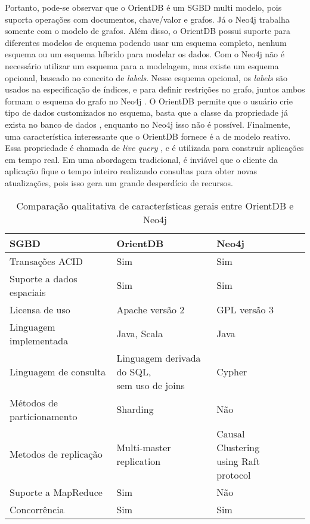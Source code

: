 	Portanto, pode-se observar que o OrientDB é um SGBD multi modelo, pois suporta operações com documentos, chave/valor e grafos. Já o Neo4j trabalha somente com o modelo de grafos. Além disso, o OrientDB possui suporte para diferentes modelos de esquema podendo usar um esquema completo, nenhum esquema ou um esquema híbrido para modelar os dados. Com o Neo4j não é necessário utilizar um esquema para a modelagem, mas existe um esquema opcional, baseado no conceito de \textit{labels}. Nesse esquema opcional, os \textit{labels} são usados na especificação de índices, e para definir restrições no grafo, juntos ambos formam o esquema do grafo no Neo4j \cite{neo4jschemaoptional}. O OrientDB permite que o usuário crie tipo de dados customizados no esquema, basta que a classe da propriedade já exista no banco de dados \cite{orientdbcreateproperty}, enquanto no Neo4j isso não é possível. Finalmente, uma característica interessante que o OrientDB fornece é a de modelo reativo. Essa propriedade é chamada de \textit{live query} \cite{orientdblivequery}, e é utilizada para construir aplicações em tempo real. Em uma abordagem tradicional, é inviável que o cliente da aplicação fique o tempo inteiro realizando consultas para obter novas atualizações, pois isso gera um grande desperdício de recursos.
	
\begin{table}[H]
\centering
\caption{Comparação qualitativa de características gerais entre OrientDB e Neo4j}
\begin{tabular}{|l|l|l|l|l|}
\hline
SGBD                       & OrientDB                                    & Neo4j \\ \hline
Transações ACID            & Sim                                         & Sim \\ \hline
Suporte a dados espaciais  & Sim                                         & Sim \\ \hline
Licensa de uso             & Apache versão 2                             & GPL versão 3 \\ \hline
Linguagem implementada     & Java, Scala                                 & Java \\ \hline
Linguagem de consulta      & \makecell{Linguagem derivada do SQL,\\ sem uso de joins} & Cypher \\ \hline
Métodos de particionamento & Sharding                                    & Não \\ \hline
Metodos de replicação      & Multi-master replication                    & \makecell{Causal Clustering \\ using Raft protocol} \\ \hline
Suporte a MapReduce        & Sim                                         & Não \\ \hline
Concorrência               & Sim                                         & Sim \\ \hline
\end{tabular}
\label{table:2}
\end{table}
	
